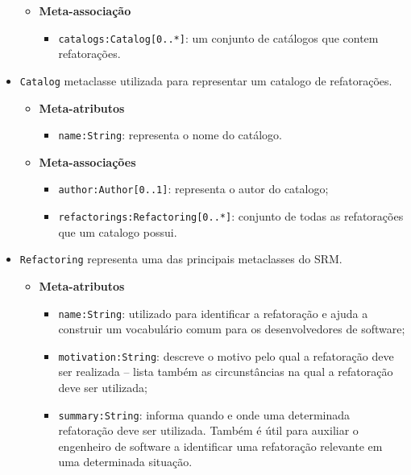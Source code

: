 \begin{itemize}
\begin{itemize}
	\item \textbf{Meta-associação}
		\begin{itemize}
			\item \texttt{catalogs:Catalog[0..*]}: um conjunto de catálogos que contem refatorações.
		\end{itemize}	
\end{itemize} 

\item \texttt{Catalog} metaclasse utilizada para representar um catalogo de refatorações.

\begin{itemize}
	\item \textbf{Meta-atributos}
		\begin{itemize}
			\item \texttt{name:String}: representa o nome do catálogo. 
		\end{itemize}	
\end{itemize} 

\begin{itemize}
	\item \textbf{Meta-associações}
		\begin{itemize}
			\item \texttt{author:Author[0..1]}: representa o autor do catalogo;
			\item \texttt{refactorings:Refactoring[0..*]}: conjunto de todas as refatorações que um catalogo possui.
		\end{itemize}	
\end{itemize} 

\item \texttt{Refactoring} representa uma das principais metaclasses do SRM.

\begin{itemize}
	\item \textbf{Meta-atributos}
		\begin{itemize}
			\item \texttt{name:String}: utilizado para identificar a refatoração e ajuda a construir um vocabulário comum para os desenvolvedores de software;
			\item \texttt{motivation:String}: descreve o motivo pelo qual a refatoração deve ser realizada – lista também as circunstâncias na qual a refatoração deve ser utilizada;
			\item \texttt{summary:String}: informa quando e onde uma determinada refatoração deve ser utilizada. Também é útil para auxiliar o engenheiro de software a identificar uma refatoração relevante em uma determinada situação. 
		\end{itemize}	
\end{itemize} 


\end{itemize}
